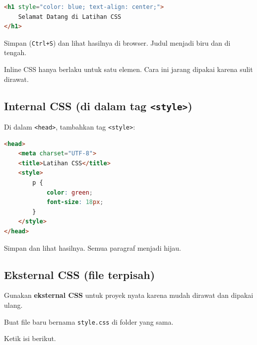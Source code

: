 \begin{lstlisting}[language=HTML, caption={Inline CSS pada tag h1}, label={lst:inline-h1}]
<h1 style="color: blue; text-align: center;">
    Selamat Datang di Latihan CSS
</h1>
\end{lstlisting}

\begin{langkah}
  \item Simpan (\texttt{Ctrl+S}) dan lihat hasilnya di browser. Judul menjadi biru dan di tengah.
\end{langkah}

\begin{catatan}
Inline CSS hanya berlaku untuk satu elemen. Cara ini jarang dipakai karena sulit dirawat.
\end{catatan}

\subsection{Internal CSS (di dalam tag \texttt{<style>})}
\label{subsec:internal-css}

\begin{langkah}
  \item Di dalam \texttt{<head>}, tambahkan tag \texttt{<style>}:
\end{langkah}

\begin{lstlisting}[language=HTML, caption={Internal CSS}, label={lst:internal-css}]
<head>
    <meta charset="UTF-8">
    <title>Latihan CSS</title>
    <style>
        p {
            color: green;
            font-size: 18px;
        }
    </style>
</head>
\end{lstlisting}

\begin{langkah}
  \item Simpan dan lihat hasilnya. Semua paragraf menjadi hijau.
\end{langkah}

\subsection{Eksternal CSS (file terpisah)}
\label{subsec:eksternal-css}

\begin{tip}
Gunakan \textbf{eksternal CSS} untuk proyek nyata karena mudah dirawat dan dipakai ulang.
\end{tip}

\begin{langkah}
  \item Buat file baru bernama \texttt{style.css} di folder yang sama.
  \item Ketik isi berikut.
\end{langkah}

